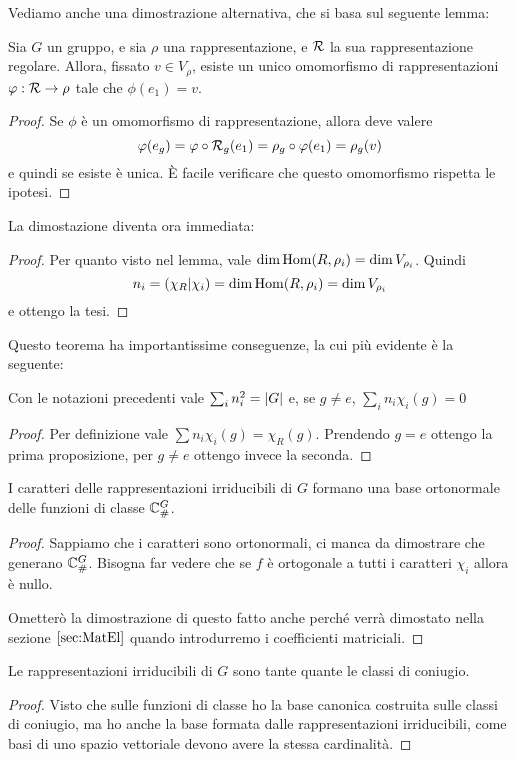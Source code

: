 Vediamo anche una dimostrazione alternativa, che si basa sul seguente lemma:
\begin{mylemma}
  Sia $G$ un gruppo, e sia $\rho$ una rappresentazione, e $\mathcal R$ la sua rappresentazione regolare. Allora, fissato $v\in V_\rho$, esiste un unico omomorfismo di rappresentazioni $\varphi: \mathcal R \rightarrow \rho$ tale che $\phi(e_1)=v$.
\end{mylemma}
\begin{proof}
  Se $\phi$ è un omomorfismo di rappresentazione, allora deve valere 
  \[
  \varphi(e_g)=\varphi \circ \mathcal R_g (e_1) = \rho_g \circ \varphi (e_1) = \rho_g(v)
  \]
  e quindi se esiste è unica. \`E facile verificare che questo omomorfismo rispetta le ipotesi.
\end{proof}

La dimostazione diventa ora immediata:
\begin{proof}
  Per quanto visto nel lemma, vale $\dim \operatorname{Hom}(R,\rho_i) = \dim V_{\rho_i}$. Quindi
  \[
		n_i = \left(\chi_R | \chi_i\right)= \dim \operatorname{Hom}(R,\rho_i) = \dim V_{\rho_i}
  \]
  e ottengo la tesi.
\end{proof}

Questo teorema ha importantissime conseguenze, la cui più evidente è la seguente:
\begin{myprop}
  Con le notazioni precedenti vale $\sum_i n_i^2 = \left|G\right|$ e, se $g\ne e$, $\sum_i n_i \chi_i(g)=0$
\end{myprop}
\begin{proof}
  Per definizione vale $\sum n_i \chi_i(g) = \chi_R(g)$. Prendendo $g=e$ ottengo la prima proposizione, per $g\ne e$ ottengo invece la seconda.
\end{proof}

\begin{mytheorem}
  I caratteri delle rappresentazioni irriducibili di $G$ formano una base ortonormale delle funzioni di classe $\mathbb C^{G}_\#$.
\end{mytheorem}

\begin{proof}
  Sappiamo che i caratteri sono ortonormali, ci manca da dimostrare che generano $\mathbb C^{G}_\#$. Bisogna far vedere che se $f$ è ortogonale a tutti i caratteri $\chi_i$ allora è nullo.
  
  Ometterò la dimostrazione di questo fatto anche perché verrà dimostato nella sezione $\ref{sec:MatEl}$ quando introdurremo i coefficienti matriciali.
\end{proof}


\begin{mytheorem}
  Le rappresentazioni irriducibili di $G$ sono tante quante le classi di coniugio.
\end{mytheorem}

\begin{proof}
  Visto che sulle funzioni di classe ho la base canonica costruita sulle classi di coniugio, ma ho anche la base formata dalle rappresentazioni irriducibili, come basi di uno spazio vettoriale devono avere la stessa cardinalità.
\end{proof}







